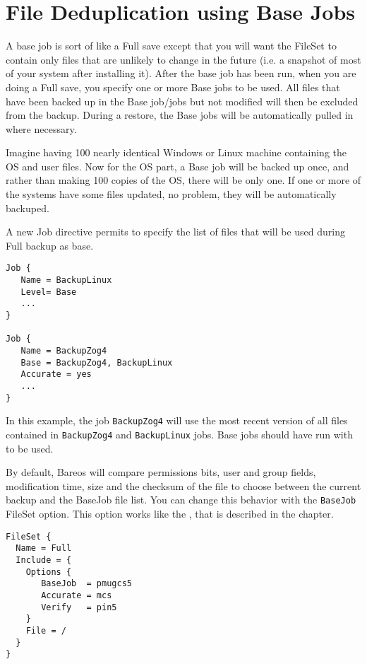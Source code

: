 \chapter{File Deduplication using Base Jobs}
\label{basejobs}

A base job is sort of like a Full save except that you will want the FileSet to
contain only files that are unlikely to change in the future (i.e.  a snapshot
of most of your system after installing it).  After the base job has been run,
when you are doing a Full save, you specify one or more Base jobs to be used.
All files that have been backed up in the Base job/jobs but not modified will
then be excluded from the backup.  During a restore, the Base jobs will be
automatically pulled in where necessary.

Imagine having 100
nearly identical Windows or Linux machine containing the OS and user files.
Now for the OS part, a Base job will be backed up once, and rather than making
100 copies of the OS, there will be only one.  If one or more of the systems
have some files updated, no problem, they will be automatically backuped.

A new Job directive  permits to specify the list of
files that will be used during Full backup as base.

\begin{verbatim}
Job {
   Name = BackupLinux
   Level= Base
   ...
}

Job {
   Name = BackupZog4
   Base = BackupZog4, BackupLinux
   Accurate = yes
   ...
}
\end{verbatim}

In this example, the job \texttt{BackupZog4} will use the most recent version
of all files contained in \texttt{BackupZog4} and \texttt{BackupLinux}
jobs. Base jobs should have run with  to be used.

By default, Bareos will compare permissions bits, user and group fields,
modification time, size and the checksum of the file to choose between the
current backup and the BaseJob file list. You can change this behavior with the
\texttt{BaseJob} FileSet option. This option works like the , that is described in the  chapter.

\begin{verbatim}
FileSet {
  Name = Full
  Include = {
    Options {
       BaseJob  = pmugcs5
       Accurate = mcs
       Verify   = pin5
    }
    File = /
  }
}
\end{verbatim}

